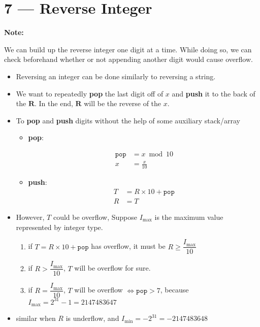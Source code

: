 \documentclass[a4paper,12pt]{article}
\begin{document}
\section{7 --- Reverse Integer}
\textbf{\large{Note:}}
\par
We can build up the reverse integer one digit at a time. While doing so, we can check beforehand whether or not appending another digit would cause overflow.
\begin{itemize}
\item Reversing an integer can be done similarly to reversing a string.
\item We want to repeatedly \textbf{pop} the last digit off of $x$ and \textbf{push} it to the back of the $\mathbf{R}$. In the end, $\mathbf{R}$ will be the reverse of the $x$.
\item To \textbf{pop} and \textbf{push} digits without the help of some auxiliary stack/array
\begin{itemize}
\item \textbf{pop}: 

\begin{align*}
\mathtt{pop} &= x \bmod 10 \\
x &= \frac{x}{10}
\end{align*}

\item \textbf{push}:
\begin{align*}
T &= R \times 10 + \mathtt{pop} \\
R &= T
\end{align*}
\end{itemize}
\item However, $T$ could be overflow, Suppose $I_{\max}$ is the maximum value represented by integer type.
\begin{enumerate}
\item if $T = R \times 10 + \mathtt{pop}$ has overflow, it must be $R \geq \dfrac{I_{\max}}{10}$
\item if $R > \dfrac{I_{\max}}{10} $, $T$ will be overflow for sure.
\item if $R = \dfrac{I_{\max}}{10}$, $T$ will be overflow $\iff \mathtt{pop} > 7$, because $I_{\max} = 2^{31} - 1 = 2147483647$
\end{enumerate}
\item similar when $R$ is underflow, and $I_{\min} = -2^{31} = -2147483648$
\end{itemize}
\end{document}
